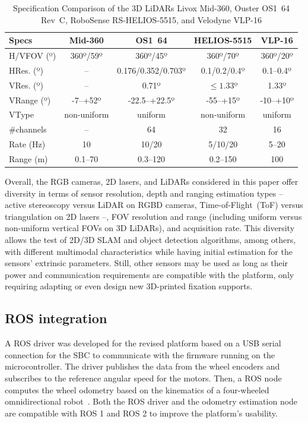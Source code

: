 \documentclass[letterpaper,10pt,conference]{IEEEtran} %
\begin{document}
\begin{table}[!t]
\renewcommand{\arraystretch}{1.15}
\setlength{\tabcolsep}{0.275em}
\caption{Specification Comparison of the 3D LiDARs
Livox Mid-360, Ouster OS1~64 Rev~C,
RoboSense RS-HELIOS-5515, and Velodyne VLP-16}
\label{tab:specs:3D-lidars}
\centering
\begin{tabular}{l c c c c}
\hline
\bfseries Specs & \bfseries Mid-360 & \bfseries OS1~64 &
\bfseries HELIOS-5515 & \bfseries VLP-16\\
\hline 
H/VFOV (º)  & 360º/59º & 360º/45º & 360º/70º & 360º/20º\\
HRes. (º)   & -- & 0.176/0.352/0.703º & 0.1/0.2/0.4º & 0.1--0.4º\\
VRes. (º)   & -- & 0.71º & $\le 1.33$º & 1.33º\\
VRange (º)  & -7--+52º & -22.5--+22.5º & -55--+15º & -10--+10º\\
VType       & non-uniform & uniform & non-uniform & uniform\\
\#channels  & -- & 64 & 32 & 16\\
Rate (Hz)   & 10 & 10/20 & 5/10/20 & 5--20\\
Range (m)   & 0.1--70 & 0.3--120 & 0.2--150 & 100\\
\hline
\end{tabular}
\end{table}

Overall, the RGB cameras, 2D lasers, and LiDARs considered in this paper
offer diversity in terms of sensor resolution,
depth and ranging estimation types
-- active stereoscopy versus LiDAR on RGBD cameras,
Time-of-Flight~(ToF) versus triangulation on 2D lasers --,
FOV resolution and range
(including uniform versus non-uniform vertical FOVs on 3D LiDARs),
and acquisition rate.
This diversity allows the test of 2D/3D SLAM and object detection algorithms,
among others, with different multimodal characteristics
while having initial estimation for the sensors' extrinsic parameters.
Still, other sensors may be used as long as
their power and communication requirements are compatible with the
platform, only requiring adapting or even design
new 3D-printed fixation supports.

\subsection{ROS integration}

A ROS driver was developed for the revised platform based on a
USB serial connection for the SBC to communicate with the
firmware running on the microcontroller. The driver publishes the
data from the wheel encoders and subscribes to the reference angular speed
for the motors. Then, a ROS node computes the wheel odometry based on
the kinematics of a four-wheeled omnidirectional robot~\cite{sousa2022jint}.
Both the ROS driver and the odometry estimation node are compatible with
ROS 1 and ROS 2 to improve the platform's usability.
\end{document}
